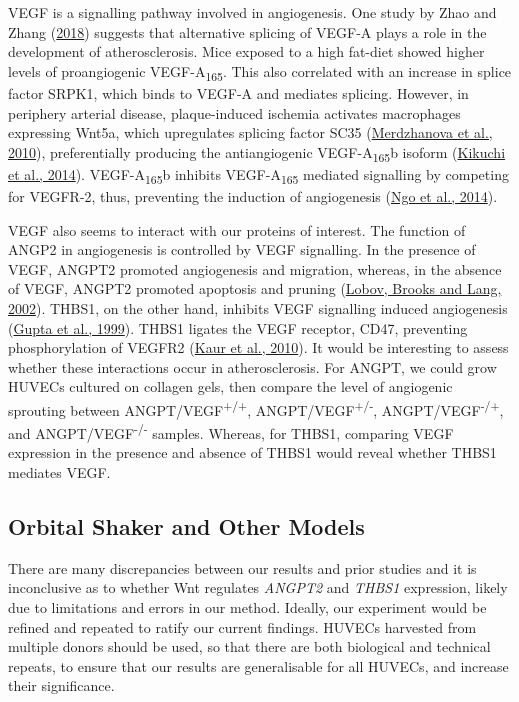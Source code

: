 \documentclass[
  11pt,
]{article}
\begin{document}
VEGF is a signalling pathway involved in angiogenesis.
One study by Zhao and Zhang (\protect\hyperlink{ref-Zhao2018}{2018}) suggests that alternative splicing of VEGF-A plays a role in the development of atherosclerosis.
Mice exposed to a high fat-diet showed higher levels of proangiogenic VEGF-A\textsubscript{165}.
This also correlated with an increase in splice factor SRPK1, which binds to VEGF-A and mediates splicing.
However, in periphery arterial disease, plaque-induced ischemia activates macrophages expressing Wnt5a, which upregulates splicing factor SC35 (\protect\hyperlink{ref-Merdzhanova2010}{Merdzhanova et al., 2010}), preferentially producing the antiangiogenic VEGF-A\textsubscript{165}b isoform (\protect\hyperlink{ref-Kikuchi2014}{Kikuchi et al., 2014}).
VEGF-A\textsubscript{165}b inhibits VEGF-A\textsubscript{165} mediated signalling by competing for VEGFR-2, thus, preventing the induction of angiogenesis (\protect\hyperlink{ref-ngo2014}{Ngo et al., 2014}).

VEGF also seems to interact with our proteins of interest.
The function of ANGP2 in angiogenesis is controlled by VEGF signalling.
In the presence of VEGF, ANGPT2 promoted angiogenesis and migration, whereas, in the absence of VEGF, ANGPT2 promoted apoptosis and pruning (\protect\hyperlink{ref-Lobov2002a}{Lobov, Brooks and Lang, 2002}).
THBS1, on the other hand, inhibits VEGF signalling induced angiogenesis (\protect\hyperlink{ref-gupta1999}{Gupta et al., 1999}).
THBS1 ligates the VEGF receptor, CD47, preventing phosphorylation of VEGFR2 (\protect\hyperlink{ref-kaur2010}{Kaur et al., 2010}).
It would be interesting to assess whether these interactions occur in atherosclerosis.
For ANGPT, we could grow HUVECs cultured on collagen gels, then compare the level of angiogenic sprouting between ANGPT/VEGF\textsuperscript{+/+}, ANGPT/VEGF\textsuperscript{+/-}, ANGPT/VEGF\textsuperscript{-/+}, and ANGPT/VEGF\textsuperscript{-/-} samples.
Whereas, for THBS1, comparing VEGF expression in the presence and absence of THBS1 would reveal whether THBS1 mediates VEGF.

\hypertarget{orbital-shaker-and-other-models}{%
\subsection{Orbital Shaker and Other Models}\label{orbital-shaker-and-other-models}}

There are many discrepancies between our results and prior studies and it is inconclusive as to whether Wnt regulates \emph{ANGPT2} and \emph{THBS1} expression, likely due to limitations and errors in our method.
Ideally, our experiment would be refined and repeated to ratify our current findings.
HUVECs harvested from multiple donors should be used, so that there are both biological and technical repeats, to ensure that our results are generalisable for all HUVECs, and increase their significance.
\end{document}
